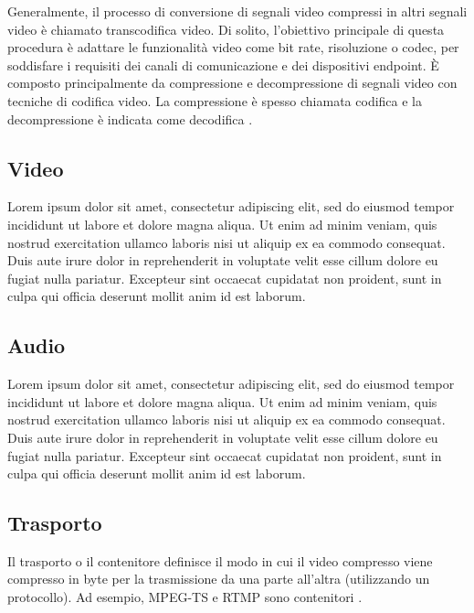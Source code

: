 Generalmente, il processo di conversione di segnali video compressi in altri segnali video è chiamato transcodifica video. Di solito, l'obiettivo principale di questa procedura è adattare le funzionalità video come bit rate, risoluzione o codec, per soddisfare i requisiti dei canali di comunicazione e dei dispositivi endpoint. È composto principalmente da compressione e decompressione di segnali video con tecniche di codifica video. La compressione è spesso chiamata codifica e la decompressione è indicata come decodifica \parencite{CombinedICTTechnologies}.

\subsection{Video}
Lorem ipsum dolor sit amet, consectetur adipiscing elit, sed do eiusmod tempor incididunt ut labore et dolore magna aliqua. Ut enim ad minim veniam, quis nostrud exercitation ullamco laboris nisi ut aliquip ex ea commodo consequat. Duis aute irure dolor in reprehenderit in voluptate velit esse cillum dolore eu fugiat nulla pariatur. Excepteur sint occaecat cupidatat non proident, sunt in culpa qui officia deserunt mollit anim id est laborum.

\subsection{Audio}
Lorem ipsum dolor sit amet, consectetur adipiscing elit, sed do eiusmod tempor incididunt ut labore et dolore magna aliqua. Ut enim ad minim veniam, quis nostrud exercitation ullamco laboris nisi ut aliquip ex ea commodo consequat. Duis aute irure dolor in reprehenderit in voluptate velit esse cillum dolore eu fugiat nulla pariatur. Excepteur sint occaecat cupidatat non proident, sunt in culpa qui officia deserunt mollit anim id est laborum.

\subsection{Trasporto}
Il trasporto o il contenitore definisce il modo in cui il video compresso viene compresso in byte per la trasmissione da una parte all'altra (utilizzando un protocollo). Ad esempio, MPEG-TS e RTMP sono contenitori \parencite{CombinedICTTechnologies}.

